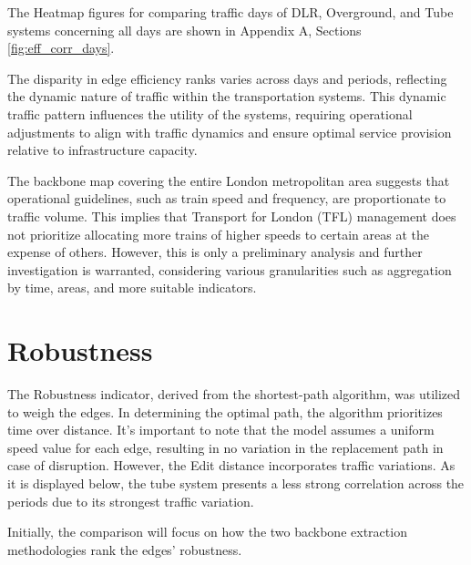\qquad The Heatmap figures for comparing traffic days of DLR, Overground, and Tube systems concerning all days are shown in Appendix A, Sections \ref{fig:eff_corr_days}.

\qquad The disparity in edge efficiency ranks varies across days and periods, reflecting the dynamic nature of traffic within the transportation systems. This dynamic traffic pattern influences the utility of the systems, requiring operational adjustments to align with traffic dynamics and ensure optimal service provision relative to infrastructure capacity.

\qquad The backbone map covering the entire London metropolitan area suggests that operational guidelines, such as train speed and frequency, are proportionate to traffic volume. This implies that Transport for London (TFL) management does not prioritize allocating more trains of higher speeds to certain areas at the expense of others. However, this is only a preliminary analysis and further investigation is warranted, considering various granularities such as aggregation by time, areas, and more suitable indicators.


\section{Robustness}

\qquad The Robustness indicator, derived from the shortest-path algorithm, was utilized to weigh the edges. In determining the optimal path, the algorithm prioritizes time over distance. It's important to note that the model assumes a uniform speed value for each edge, resulting in no variation in the replacement path in case of disruption. However, the Edit distance incorporates traffic variations. As it is displayed below, the tube system presents a less strong correlation across the periods due to its strongest traffic variation.

\qquad Initially, the comparison will focus on how the two backbone extraction methodologies rank the edges' robustness.

